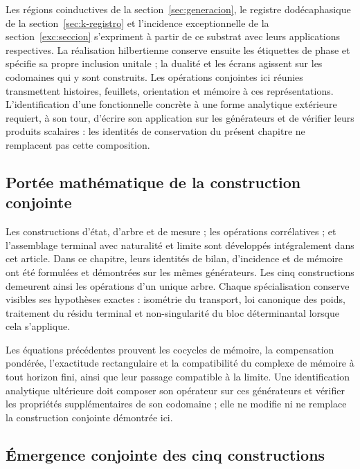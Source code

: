 Les régions coinductives de la section~\ref{sec:generacion}, le registre
dodécaphasique de la section~\ref{sec:k-registro} et l’incidence exceptionnelle
de la section~\ref{exc:seccion} s’expriment à partir de ce substrat avec leurs applications
respectives. La réalisation hilbertienne conserve ensuite les étiquettes de
phase et spécifie sa propre inclusion unitale ; la dualité et les écrans
agissent sur les codomaines qui y sont construits. Les opérations conjointes ici
réunies transmettent histoires, feuillets, orientation et mémoire à ces
représentations. L’identification d’une fonctionnelle concrète à une forme
analytique extérieure requiert, à son tour, d’écrire son application sur les
générateurs et de vérifier leurs produits scalaires : les identités de
conservation du présent chapitre ne remplacent pas cette composition.


\subsection{Portée mathématique de la construction conjointe}
Les constructions d'état, d'arbre et de mesure ; les opérations corrélatives ; et
l'assemblage terminal avec naturalité et limite sont développés intégralement
dans cet article. Dans ce chapitre, leurs identités de
bilan, d'incidence et de mémoire ont été formulées et démontrées sur les mêmes
générateurs. Les cinq constructions demeurent ainsi les opérations d'un
unique arbre. Chaque spécialisation conserve visibles ses hypothèses exactes :
isométrie du transport, loi canonique des poids, traitement du résidu
terminal et non-singularité du bloc déterminantal lorsque cela s'applique.

Les équations précédentes prouvent les cocycles de mémoire, la compensation
pondérée, l'exactitude rectangulaire et la compatibilité du complexe de
mémoire à tout horizon fini, ainsi que leur passage compatible à la limite.
Une identification analytique ultérieure doit composer son opérateur sur ces
générateurs et vérifier les propriétés supplémentaires de son codomaine ; elle ne
modifie ni ne remplace la construction conjointe démontrée ici.

\iffalse
\subsection{Émergence conjointe des cinq constructions}
\label{sec:cinco-construcciones-continuo-ch}

